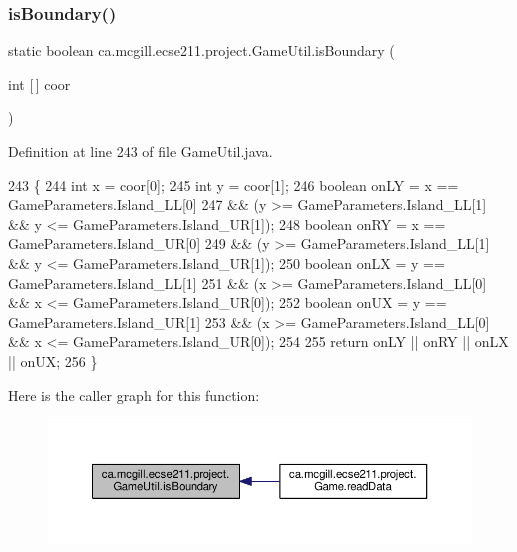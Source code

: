 \subsubsection{\texorpdfstring{is\+Boundary()}{isBoundary()}}
{\footnotesize\ttfamily static boolean ca.\+mcgill.\+ecse211.\+project.\+Game\+Util.\+is\+Boundary (\begin{DoxyParamCaption}\item[{int \mbox{[}$\,$\mbox{]}}]{coor }\end{DoxyParamCaption})\hspace{0.3cm}{\ttfamily [static]}}



Definition at line 243 of file Game\+Util.\+java.


\begin{DoxyCode}
243                                                \{
244     \textcolor{keywordtype}{int} x = coor[0];
245     \textcolor{keywordtype}{int} y = coor[1];
246     \textcolor{keywordtype}{boolean} onLY = x == GameParameters.Island\_LL[0]
247         && (y >= GameParameters.Island\_LL[1] && y <= GameParameters.Island\_UR[1]);
248     \textcolor{keywordtype}{boolean} onRY = x == GameParameters.Island\_UR[0]
249         && (y >= GameParameters.Island\_LL[1] && y <= GameParameters.Island\_UR[1]);
250     \textcolor{keywordtype}{boolean} onLX = y == GameParameters.Island\_LL[1]
251         && (x >= GameParameters.Island\_LL[0] && x <= GameParameters.Island\_UR[0]);
252     \textcolor{keywordtype}{boolean} onUX = y == GameParameters.Island\_UR[1]
253         && (x >= GameParameters.Island\_LL[0] && x <= GameParameters.Island\_UR[0]);
254 
255     \textcolor{keywordflow}{return} onLY || onRY || onLX || onUX;
256   \}
\end{DoxyCode}
Here is the caller graph for this function\+:
\nopagebreak
\begin{figure}[H]
\begin{center}
\leavevmode
\includegraphics[width=350pt]{classca_1_1mcgill_1_1ecse211_1_1project_1_1_game_util_aa9819819c4de2ef025caac87d0c0b0db_icgraph}
\end{center}
\end{figure}
\mbox{\label{classca_1_1mcgill_1_1ecse211_1_1project_1_1_game_util_a4b657445545fb1a814b6699724d72042}} 
